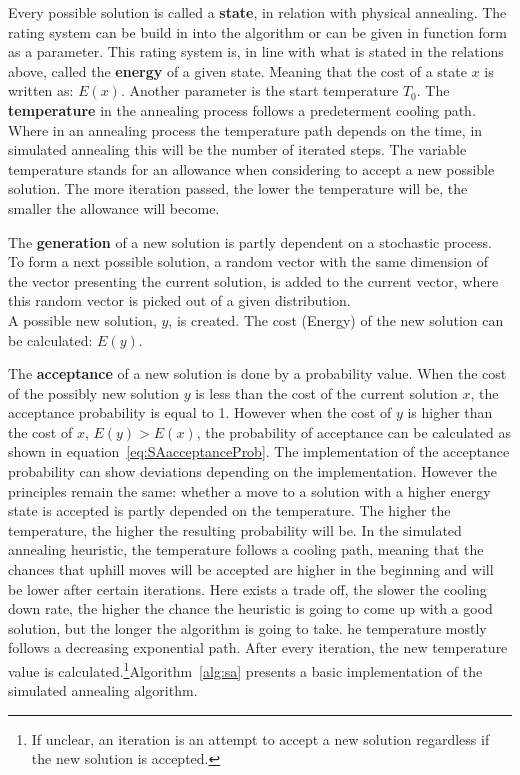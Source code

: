 Every possible solution is called a \textbf{state}, in relation with physical annealing.
The rating system can be build in into the algorithm or can be given in function form as a parameter.
This rating system is, in line with what is stated in the relations above, called the \textbf{energy} of a given state.
Meaning that the cost of a state $x$ is written as: $E(x)$. 
Another parameter is the start temperature $T_0$.
The \textbf{temperature} in the annealing process follows a predeterment cooling path.
Where in an annealing process the temperature path depends on the time, in simulated annealing this will be the number of iterated steps.
The variable temperature stands for an allowance when considering to accept a new possible solution. 
The more iteration passed, the lower the temperature will be, the smaller the allowance will become.
\par 
The \textbf{generation} of a new solution is partly dependent on a stochastic process. 
To form a next possible solution, a random vector with the same dimension of the vector presenting the current solution, is added to the current vector, where this random vector is picked out of a given distribution.\\
A possible new solution, $y$, is created.
The cost (Energy) of the new solution can be calculated: $E(y)$.
\par 
The \textbf{acceptance} of a new solution is done by a probability value.
When the cost of the possibly new solution $y$ is less than the cost of the current solution $x$, the acceptance probability is equal to 1.
However when the cost of $y$ is higher than the cost of $x$, $E(y)>E(x)$, the probability of acceptance can be calculated as shown in equation~\ref{eq:SAacceptanceProb}.
The implementation of the acceptance probability can show deviations depending on the implementation. However the principles remain the same: whether a move to a solution with a higher energy state is accepted is partly depended on the temperature.
The higher the temperature, the higher the resulting probability will be. 
In the simulated annealing heuristic, the temperature follows a cooling path, meaning that the chances that uphill moves will be accepted are higher in the beginning and will be lower after certain iterations.
Here exists a trade off, the slower the cooling down rate, the higher the chance the heuristic is going to come up with a good solution, but the longer the algorithm is going to take.
he temperature mostly follows a decreasing exponential path.
After every iteration, the new temperature value is calculated.\footnote{If unclear, an iteration is an attempt to accept a new solution regardless if the new solution is accepted.}Algorithm~\ref{alg:sa} presents a basic implementation of the simulated annealing algorithm.

